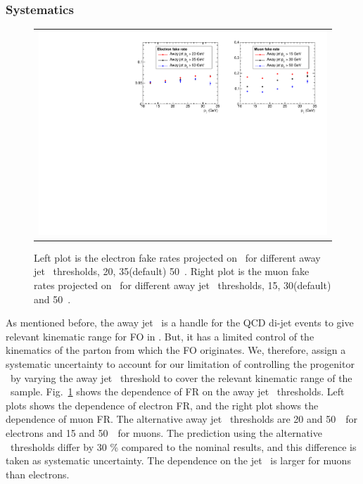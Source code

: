 \subsubsection{Systematics}
%
\begin{figure}[htp] 
\centering 
\begin{tabular}{c} 
\includegraphics[width=1.0\textwidth]{figures/FR_jetpt_variation.pdf}
\end{tabular} 
\caption{Left plot is the electron fake rates projected on \pt\ for 
different away jet \pt\ thresholds, 20, 35(default) 50~\GeV. 
Right plot is the muon fake rates projected on \pt\ for
different away jet \pt\ thresholds, 15, 30(default) and 50~\GeV.} 
\label{fig:FR_jetpt_variation} 
\end{figure} 
As mentioned before, the away jet \pt\ is a handle for the QCD di-jet events 
to give relevant kinematic range for FO in \Wjets.  
But, it has a limited control of the kinematics of the parton
from which the FO originates. 
We, therefore, assign a systematic uncertainty 
to account for our limitation of controlling the progenitor \pt\ 
by varying the away jet \pt\ threshold
to cover the relevant kinematic range of the \Wjets\ sample.
Fig.~\ref{fig:FR_jetpt_variation} shows the dependence of FR on the 
away jet \pt\ thresholds. Left plots shows the dependence of electron 
FR, and the right plot shows the dependence of muon FR. 
The alternative away jet \pt\ thresholds are 20 and 50~\GeV\ for electrons 
and 15 and 50~\GeV\ for muons. The prediction using the alternative \pt\ thresholds
differ by 30 \% compared to the nominal results, and this difference 
is taken as systematic uncertainty. 
The dependence on the jet \pt\ is larger for muons than electrons. 
